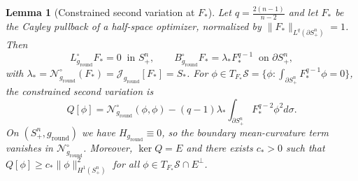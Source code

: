 \documentclass[11pt,reqno,a4paper]{amsart}
\numberwithin{equation}{section}
\theoremstyle{plain}
\newtheorem{lemma}[theorem]{Lemma}
\theoremstyle{remark}
\theoremstyle{plain}
\begin{document}
\begin{lemma}[Constrained second variation at $F_\ast$]\label{lem:hessian-sphere}
Let $q=\frac{2(n-1)}{n-2}$ and let $F_\ast$ be the Cayley pullback of a half-space optimizer, normalized by $\|F_\ast\|_{L^q(\partial S^n_+)}=1$. Then
\[
L_{g_{\mathrm{round}}}^\circ F_\ast=0\ \text{ in }S^n_+,
\qquad
B_{g_{\mathrm{round}}}^\circ F_\ast=\lambda_\ast F_\ast^{q-1}\ \text{ on }\partial S^n_+,
\]
with $\lambda_\ast=\mathcal N^\circ_{g_{\mathrm{round}}}(F_\ast)=\mathcal J_{g_{\mathrm{round}}}[F_\ast]=S_\ast$. For $\phi\in T_{F_\ast}\mathcal S=\{\phi:\int_{\partial S^n_+}F_\ast^{q-1}\phi=0\}$, the constrained second variation is
\begin{equation}\label{eq:Hessian-sphere}
Q[\phi]
= \mathcal N^\circ_{g_{\mathrm{round}}}(\phi,\phi)-(q-1)\lambda_\ast\int_{\partial S^n_+} F_\ast^{q-2}\phi^2d\sigma.
\end{equation}
On $(S^n_+,g_{\mathrm{round}})$ we have $H_{g_{\mathrm{round}}}\equiv0$, so the boundary mean-curvature term vanishes in $\mathcal N^\circ_{g_{\mathrm{round}}}$. Moreover, $\ker Q=E$ and there exists $c_\ast>0$ such that $Q[\phi]\ge c_\ast\|\phi\|_{H^1(S^n_+)}^2$ for all $\phi\in T_{F_\ast}\mathcal S\cap E^\perp$.
\end{lemma}
\end{document}

